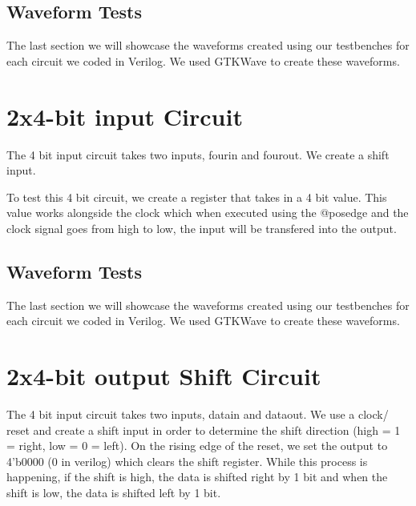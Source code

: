 \documentclass[12pt]{article}
\begin{document}
\newpage



\subsection{Waveform Tests}

The last section we will showcase the waveforms created using our testbenches for each circuit we coded in Verilog. We used GTKWave to create these waveforms.








\section{2x4-bit input Circuit}
The 4 bit input circuit takes two inputs, fourin and fourout. We create a shift input. 

To test this 4 bit circuit, we create a register that takes in a 4 bit value. This value works alongside the clock which when executed using the @posedge and the clock signal goes from high to low, the input will be transfered into the output.





\subsection{Waveform Tests}

The last section we will showcase the waveforms created using our testbenches for each circuit we coded in Verilog. We used GTKWave to create these waveforms.






\section{2x4-bit output Shift Circuit}
The 4 bit input circuit takes two inputs, datain and dataout. We use a clock/ reset and create a shift input in order to determine the shift direction (high = 1 = right, low = 0 = left).  On the rising edge of the reset, we set the output to 4'b0000 (0 in verilog) which clears the shift register. While this process is happening, if the shift is high, the data is shifted right by 1 bit and when the shift is low, the data is shifted left by 1 bit.
\end{document}

